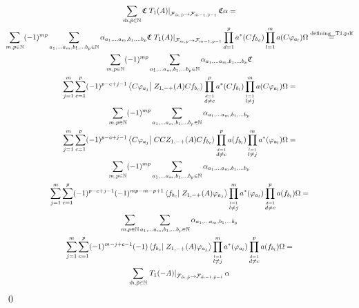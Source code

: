\documentclass[a4paper,12pt]{article}
\newcommand{\equaltext}[1]{\ensuremath{\stackrel{\text{#1}}{=}}}
\begin{document}
\begin{multline}
\sum_{\tilde{m},\tilde{p}\in \mathbb{N}}\mathfrak{C} \left. T_1(A)\right|_{\mathcal{F}_{\tilde{m},\tilde{p}}\rightarrow\mathcal{F}_{\tilde{m}-1,\tilde{p}-1}} \mathfrak{C} \alpha= \\
\sum_{m,p \in \mathbb{N}} (-1)^{m p}\sum_{a_1, \dots a_m, b_1, \dots b_p \in \mathbb{N}} \alpha_{a_1, \dots a_m, b_1, \dots b_p} \mathfrak{C} \left. T_1(A)\right|_{\mathcal{F}_{m,p}\rightarrow\mathcal{F}_{m-1,p-1}} \prod_{d=1}^p a^*(C f_{b_d}) \prod_{l=1}^m a(C \varphi_{a_l})\Omega\equaltext{defining\textunderscore T1.pdf}\\
\sum_{m,p \in \mathbb{N}} (-1)^{m p}\sum_{a_1, \dots a_m, b_1, \dots b_p \in \mathbb{N}} \alpha_{a_1, \dots a_m, b_1, \dots b_p} \mathfrak{C} \\
\sum_{j=1}^m \sum_{c=1}^p (-1)^{p-c+j-1}  \left<C \varphi_{a_j}\right|\left.Z_{1,-+}(A)C f_{b_c}\right> \prod_{\stackrel{d=1}{d\neq c}}^{p} a^*(C f_{b_l})  \prod_{\stackrel{l=1}{l\neq j}}^m a(C \varphi_{a_l}) \Omega=\\
\sum_{m,p \in \mathbb{N}} (-1)^{m p}\sum_{a_1, \dots a_m, b_1, \dots b_p \in \mathbb{N}} \alpha_{a_1, \dots a_m, b_1, \dots b_p}  \\
\sum_{j=1}^m \sum_{c=1}^p (-1)^{p-c+j-1}  \left<C \varphi_{a_j}\right|\left. CC Z_{1,-+}(A)C f_{b_c}\right> \prod_{\stackrel{d=1}{d\neq c}}^{p} a( f_{b_l})  \prod_{\stackrel{l=1}{l\neq j}}^m a^*( \varphi_{a_l}) \Omega=\\
\sum_{m,p \in \mathbb{N}} (-1)^{m p}\sum_{a_1, \dots a_m, b_1, \dots b_p \in \mathbb{N}} \alpha_{a_1, \dots a_m, b_1, \dots b_p}  \\
\sum_{j=1}^m \sum_{c=1}^p (-1)^{p-c+j-1}  (-1)^{mp -m -p +1}\left< f_{b_c}\right|\left.  Z_{1,-+}(A) \varphi_{a_j}\right>\prod_{\stackrel{l=1}{l\neq j}}^m a^*( \varphi_{a_l}) \prod_{\stackrel{d=1}{d\neq c}}^{p} a( f_{b_l})   \Omega=\\
\sum_{m,p \in \mathbb{N}} \sum_{a_1, \dots a_m, b_1, \dots b_p \in \mathbb{N}} \alpha_{a_1, \dots a_m, b_1, \dots b_p}  \\
\sum_{j=1}^m \sum_{c=1}^p (-1)^{m-j+c-1}  (-1)\left< f_{b_c}\right|\left.  Z_{1,-+}(A) \varphi_{a_j}\right>\prod_{\stackrel{l=1}{l\neq j}}^m a^*( \varphi_{a_l}) \prod_{\stackrel{d=1}{d\neq c}}^{p} a( f_{b_l})   \Omega=\\
\sum_{\tilde{m},\tilde{p}\in \mathbb{N}}\left. T_1(-A)\right|_{\mathcal{F}_{\tilde{m},\tilde{p}}\rightarrow\mathcal{F}_{\tilde{m}-1,\tilde{p}-1}}  \alpha
\end{multline}
\qed
\end{document}
